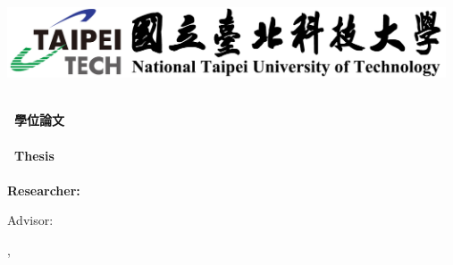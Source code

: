 \begin{titlepage}
    \newpage
    \begin{center}
        \includegraphics[width=13cm]{ntut-logo-with-label-eng.jpg}
        
        \huge\bf\deptCname\\%
        \huge\bf\degreeCname ~學位論文\\ %
        \LARGE\bf\fulldeptEname \\%
        \LARGE\bf\degreeEname ~Thesis\\ %

        \vfill
        \LARGE\bf\eTitle\\ %

        \vfill
        {\Large Researcher: \myEname}

        \vfill
        {\Large Advisor: \advisorEname}

        \vfill
        {\Large \eMonth, \eYear}
    \end{center}
\end{titlepage}